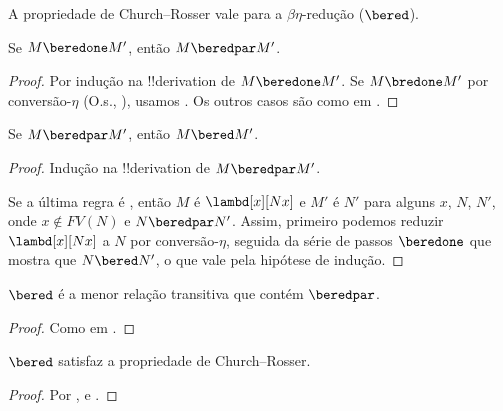 \documentclass[../../../include/open-logic-section]{subfiles}
\begin{document}


A propriedade de Church--Rosser vale para a $\beta\eta$-redução
($\bered$).

\begin{lem}
  Se $M \beredone M'$, então $M \beredpar M'$.
\end{lem}

\begin{proof} 
  Por indução na !!{derivation} de $M \beredone M'$. Se $M \bredone M'$
  por conversão-$\eta$ (O.s.\@, ), usamos
  . Os outros casos são como em
  .
\end{proof}


\begin{lem}
  Se $M \beredpar M'$, então $M \bered M'$.
\end{lem}

\begin{proof} Indução na !!{derivation} de $M \beredpar M'$.

  Se a última regra é , então $M$ é
  $\lambd[x][Nx]$ e $M'$ é $N'$ para alguns $x$, $N$, $N'$, onde
  $x \notin FV(N)$ e $N \beredpar N'$. Assim, primeiro podemos reduzir
  $\lambd[x][Nx]$ a $N$ por conversão-$\eta$, seguida da série de passos
  $\beredone$ que mostra que $N \bered N'$, o que vale pela hipótese de
  indução.
\end{proof}


\begin{lem}
  $\bered$ é a menor relação transitiva que contém $\beredpar$.
\end{lem}

\begin{proof}
  Como em .
\end{proof}

\begin{thm}
  $\bered$ satisfaz a propriedade de Church--Rosser.
\end{thm}

\begin{proof}
  Por ,  e .
\end{proof}
\end{document}
